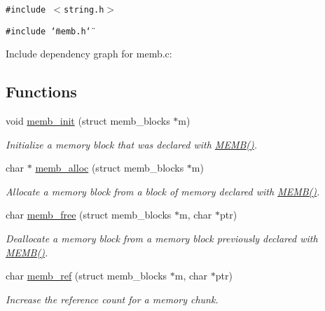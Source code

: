 {\tt \#include $<$string.h$>$}\par
{\tt \#include \char`\"{}memb.h\char`\"{}}\par


Include dependency graph for memb.c:\subsection*{Functions}
\begin{CompactItemize}
\item 
void \hyperlink{a00060_gd58a6c7e62ae59bf7a016ded12ca2910}{memb\_\-init} (struct memb\_\-blocks $\ast$m)
\begin{CompactList}\small\item\em Initialize a memory block that was declared with \hyperlink{a00060_g8457539d6a6eaecded820f4042b8314a}{MEMB()}. \item\end{CompactList}\item 
char $\ast$ \hyperlink{a00060_g73bf7c370e6ada339f102d4c9768e48c}{memb\_\-alloc} (struct memb\_\-blocks $\ast$m)
\begin{CompactList}\small\item\em Allocate a memory block from a block of memory declared with \hyperlink{a00060_g8457539d6a6eaecded820f4042b8314a}{MEMB()}. \item\end{CompactList}\item 
char \hyperlink{a00060_g7174da2ea729ba661256d123f08ed272}{memb\_\-free} (struct memb\_\-blocks $\ast$m, char $\ast$ptr)
\begin{CompactList}\small\item\em Deallocate a memory block from a memory block previously declared with \hyperlink{a00060_g8457539d6a6eaecded820f4042b8314a}{MEMB()}. \item\end{CompactList}\item 
char \hyperlink{a00060_ga02c1627ee9488468c8cdef7fed74d91}{memb\_\-ref} (struct memb\_\-blocks $\ast$m, char $\ast$ptr)
\begin{CompactList}\small\item\em Increase the reference count for a memory chunk. \item\end{CompactList}\end{CompactItemize}
